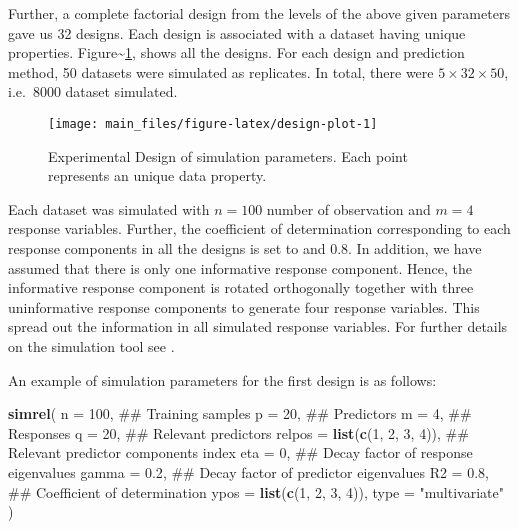\documentclass[12pt,3p,authoryear]{elsarticle}
\newenvironment{Shaded}{\begin{snugshade}}{\end{snugshade}}
\newcommand{\KeywordTok}[1]{\textcolor[rgb]{0.13,0.29,0.53}{\textbf{#1}}}
\newcommand{\DataTypeTok}[1]{\textcolor[rgb]{0.13,0.29,0.53}{#1}}
\newcommand{\DecValTok}[1]{\textcolor[rgb]{0.00,0.00,0.81}{#1}}
\newcommand{\FloatTok}[1]{\textcolor[rgb]{0.00,0.00,0.81}{#1}}
\newcommand{\StringTok}[1]{\textcolor[rgb]{0.31,0.60,0.02}{#1}}
\newcommand{\NormalTok}[1]{#1}
\providecommand{\tightlist}{%
  \setlength{\itemsep}{0pt}\setlength{\parskip}{0pt}}
\begin{document}
Further, a complete factorial design from the levels of the above given
parameters gave us 32 designs. Each design is associated with a dataset
having unique properties. Figure\textasciitilde{}\ref{fig:design-plot},
shows all the designs. For each design and prediction method, 50
datasets were simulated as replicates. In total, there were
\(5 \times 32 \times 50\), i.e.~8000 dataset simulated.

\begin{figure}
\texttt{[image: main\_files/figure-latex/design-plot-1]} \caption{Experimental Design of simulation parameters. Each point represents an unique data property.}\label{fig:design-plot}
\end{figure}

\begin{description}
\tightlist
\item[\textbf{Common parameters:}]
Each dataset was simulated with \(n = 100\) number of observation and
\(m = 4\) response variables. Further, the coefficient of determination
corresponding to each response components in all the designs is set to
and 0.8. In addition, we have assumed that there is only one informative
response component. Hence, the informative response component is rotated
orthogonally together with three uninformative response components to
generate four response variables. This spread out the information in all
simulated response variables. For further details on the simulation tool
see \citep{Rimal2018}.
\end{description}

An example of simulation parameters for the first design is as follows:

\begin{Shaded}
\begin{Highlighting}[]
\KeywordTok{simrel}\NormalTok{(}
    \DataTypeTok{n       =} \DecValTok{100}\NormalTok{,                 ## Training samples}
    \DataTypeTok{p       =} \DecValTok{20}\NormalTok{,                  ## Predictors}
    \DataTypeTok{m       =} \DecValTok{4}\NormalTok{,                   ## Responses}
    \DataTypeTok{q       =} \DecValTok{20}\NormalTok{,                  ## Relevant predictors}
    \DataTypeTok{relpos  =} \KeywordTok{list}\NormalTok{(}\KeywordTok{c}\NormalTok{(}\DecValTok{1}\NormalTok{, }\DecValTok{2}\NormalTok{, }\DecValTok{3}\NormalTok{, }\DecValTok{4}\NormalTok{)), ## Relevant predictor components index}
    \DataTypeTok{eta     =} \DecValTok{0}\NormalTok{,                   ## Decay factor of response eigenvalues}
    \DataTypeTok{gamma   =} \FloatTok{0.2}\NormalTok{,                 ## Decay factor of predictor eigenvalues}
    \DataTypeTok{R2      =} \FloatTok{0.8}\NormalTok{,                 ## Coefficient of determination}
    \DataTypeTok{ypos    =} \KeywordTok{list}\NormalTok{(}\KeywordTok{c}\NormalTok{(}\DecValTok{1}\NormalTok{, }\DecValTok{2}\NormalTok{, }\DecValTok{3}\NormalTok{, }\DecValTok{4}\NormalTok{)),}
    \DataTypeTok{type    =} \StringTok{"multivariate"}
\NormalTok{)}
\end{Highlighting}
\end{Shaded}
\end{document}
